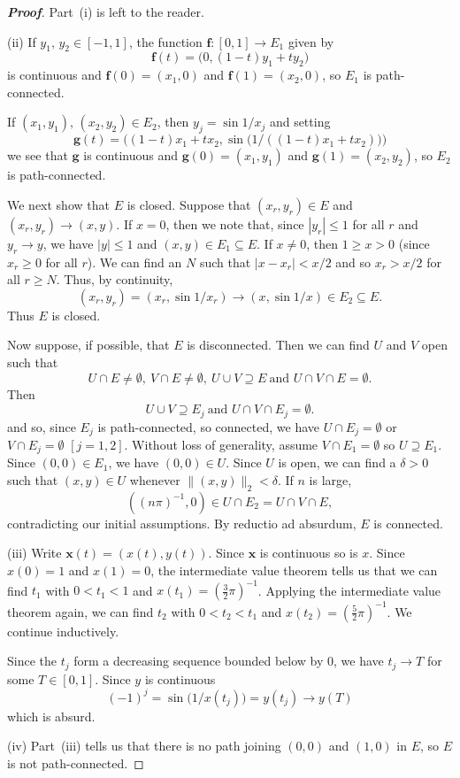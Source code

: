 \begin{proof}[\bf Proof] Part~(i) is left to the reader.

(ii) If $y_{1},\,y_{2}\in[-1,1]$, the function
${\mathbf f}:[0,1]\rightarrow E_{1}$ given by
\[{\mathbf f}(t)=\big(0,(1-t)y_{1}+ty_{2}\big)\]
is continuous and ${\mathbf f}(0)=(x_{1},0)$ and
${\mathbf f}(1)=(x_{2},0)$,
so $E_{1}$ is path-connected.

If $(x_{1},y_{1}),\,(x_{2},y_{2})\in E_{2}$,
then $y_{j}=\sin 1/x_{j}$ and setting
\[{\mathbf g}(t)=
\biggr((1-t)x_{1}+tx_{2},\sin\big(1/((1-t)x_{1}+tx_{2})\big)\biggr)
\]
we see that ${\mathbf g}$ is continuous and
${\mathbf g}(0)=(x_{1},y_{1})$ and
${\mathbf g}(1)=(x_{2},y_{2})$,
so $E_{2}$ is path-connected.

We next show that $E$ is closed.
Suppose that $(x_{r},y_{r})\in E$
and $(x_{r},y_{r})\rightarrow (x,y)$. If $x=0$, then
we note that, since $|y_{r}|\leq 1$ for all $r$ and
$y_{r}\rightarrow y$, we have $|y|\leq 1$ and
$(x,y)\in E_{1}\subseteq E$. If $x\neq 0$, then
$1\geq x>0$ (since $x_{r}\geq 0$ for all $r$). We can find an $N$
such that $|x-x_{r}|<x/2$ and so $x_{r}>x/2$ for all $r\geq N$.
Thus, by continuity,
\[(x_{r},y_{r})=(x_{r},\sin 1/x_{r})\rightarrow (x,\sin 1/x)
\in E_{2}\subseteq E.\]
Thus $E$ is closed.

Now suppose, if possible, that $E$ is disconnected.
Then we can find $U$ and $V$ open such that
\[U\cap E\neq\emptyset,\ V\cap E\neq\emptyset,\ U\cup V\supseteq E
\ \text{and $U\cap V\cap E=\emptyset$}.\]
Then
\[U\cup V\supseteq E_{j}
\ \text{and $U\cap V\cap E_{j}=\emptyset$}.\]
and so, since $E_{j}$ is path-connected, so connected,
we have $U\cap E_{j}=\emptyset$ or $V\cap E_{j}=\emptyset$
$[j=1,2]$. Without loss of generality, assume $V\cap E_{1}=\emptyset$
so $U\supseteq E_{1}$. Since $(0,0)\in E_{1}$, we have
$(0,0)\in U$. Since $U$ is open, we can find a $\delta>0$
such that $(x,y)\in U$ whenever $\|(x,y)\|_{2}<\delta$.
If $n$ is large,
\[((n\pi)^{-1},0)\in U\cap E_{2}=U\cap V\cap E,\]
contradicting our initial assumptions.
By reductio ad absurdum, $E$ is connected.

(iii) Write ${\mathbf x}(t)=(x(t),y(t))$. Since ${\mathbf x}$
is continuous so is $x$. Since $x(0)=1$ and $x(1)=0$,
the intermediate value theorem tells us that we can find
$t_{1}$ with $0<t_{1}<1$ and $x(t_{1})=(\tfrac{3}{2}\pi)^{-1}$.
Applying the  intermediate value theorem again, we can
find $t_{2}$ with $0<t_{2}<t_{1}$ and
$x(t_{2})=(\tfrac{5}{2}\pi)^{-1}$. We continue inductively.

Since the $t_{j}$ form a decreasing sequence bounded below
by $0$, we have $t_{j}\rightarrow T$ for some $T\in[0,1]$.
Since $y$ is continuous
\[(-1)^{j}=\sin\big(1/x(t_{j})\big)=y(t_{j})\rightarrow y(T)\]
which is absurd.

(iv) Part~(iii) tells us that there is no path joining
$(0,0)$ and $(1,0)$ in $E$, so $E$ is not path-connected.
\end{proof}

